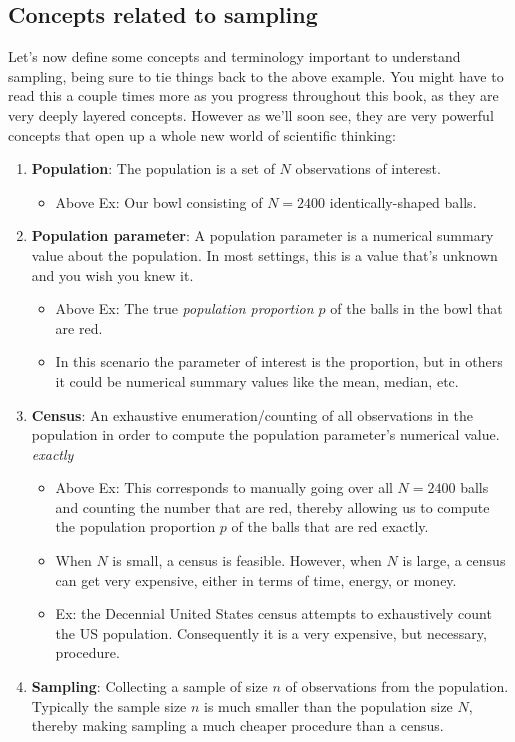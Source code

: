 \documentclass[12pt,]{krantz}
\providecommand{\tightlist}{%
  \setlength{\itemsep}{0pt}\setlength{\parskip}{0pt}}
\begin{document}
\subsection*{Concepts related to
sampling}\label{concepts-related-to-sampling}


Let's now define some concepts and terminology important to understand
sampling, being sure to tie things back to the above example. You might
have to read this a couple times more as you progress throughout this
book, as they are very deeply layered concepts. However as we'll soon
see, they are very powerful concepts that open up a whole new world of
scientific thinking:

\begin{enumerate}
\def\labelenumi{\arabic{enumi}.}
\tightlist
\item
  \textbf{Population}: The population is a set of \(N\) observations of
  interest.

  \begin{itemize}
  \tightlist
  \item
    Above Ex: Our bowl consisting of \(N=2400\) identically-shaped
    balls.
  \end{itemize}
\item
  \textbf{Population parameter}: A population parameter is a numerical
  summary value about the population. In most settings, this is a value
  that's unknown and you wish you knew it.

  \begin{itemize}
  \tightlist
  \item
    Above Ex: The true \emph{population proportion \(p\)} of the balls
    in the bowl that are red.
  \item
    In this scenario the parameter of interest is the proportion, but in
    others it could be numerical summary values like the mean, median,
    etc.
  \end{itemize}
\item
  \textbf{Census}: An exhaustive enumeration/counting of all
  observations in the population in order to compute the population
  parameter's numerical value. \emph{exactly}

  \begin{itemize}
  \tightlist
  \item
    Above Ex: This corresponds to manually going over all \(N=2400\)
    balls and counting the number that are red, thereby allowing us to
    compute the population proportion \(p\) of the balls that are red
    exactly.
  \item
    When \(N\) is small, a census is feasible. However, when \(N\) is
    large, a census can get very expensive, either in terms of time,
    energy, or money.
  \item
    Ex: the Decennial United States census attempts to exhaustively
    count the US population. Consequently it is a very expensive, but
    necessary, procedure.
  \end{itemize}
\item
  \textbf{Sampling}: Collecting a sample of size \(n\) of observations
  from the population. Typically the sample size \(n\) is much smaller
  than the population size \(N\), thereby making sampling a much cheaper
  procedure than a census.


\end{enumerate}
\end{document}
